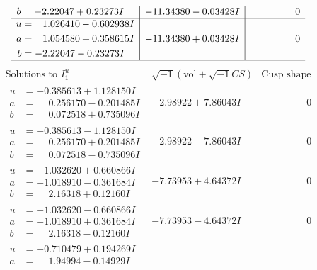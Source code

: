 \documentclass[1p]{elsarticle_modified}
\theoremstyle{definition}
\newcommand{\I}{\sqrt{-1}}
\begin{document}
$$\begin{array}{c|c|c}
\begin{aligned}
b &= -2.22047 + 0.23273 I\end{aligned}
 & -11.34380 - 0.03428 I & \phantom{-0.000000 } 0 \\ \hline\begin{aligned}
u &= \phantom{-}1.026410 - 0.602938 I \\
a &= \phantom{-}1.054580 + 0.358615 I \\
b &= -2.22047 - 0.23273 I\end{aligned}
 & -11.34380 + 0.03428 I & \phantom{-0.000000 } 0\\
 \hline 
 \end{array}$$\newpage$$\begin{array}{c|c|c}  
\text{Solutions to }I^u_{1}& \I (\text{vol} + \sqrt{-1}CS) & \text{Cusp shape}\\
 \hline 
\begin{aligned}
u &= -0.385613 + 1.128150 I \\
a &= \phantom{-}0.256170 - 0.201485 I \\
b &= \phantom{-}0.072518 + 0.735096 I\end{aligned}
 & -2.98922 + 7.86043 I & \phantom{-0.000000 } 0 \\ \hline\begin{aligned}
u &= -0.385613 - 1.128150 I \\
a &= \phantom{-}0.256170 + 0.201485 I \\
b &= \phantom{-}0.072518 - 0.735096 I\end{aligned}
 & -2.98922 - 7.86043 I & \phantom{-0.000000 } 0 \\ \hline\begin{aligned}
u &= -1.032620 + 0.660866 I \\
a &= -1.018910 - 0.361684 I \\
b &= \phantom{-}2.16318 + 0.12160 I\end{aligned}
 & -7.73953 + 4.64372 I & \phantom{-0.000000 } 0 \\ \hline\begin{aligned}
u &= -1.032620 - 0.660866 I \\
a &= -1.018910 + 0.361684 I \\
b &= \phantom{-}2.16318 - 0.12160 I\end{aligned}
 & -7.73953 - 4.64372 I & \phantom{-0.000000 } 0 \\ \hline\begin{aligned}
u &= -0.710479 + 0.194269 I \\
a &= \phantom{-}1.94994 - 0.14929 I \\

\end{aligned}
\end{array}$$
\end{document}
